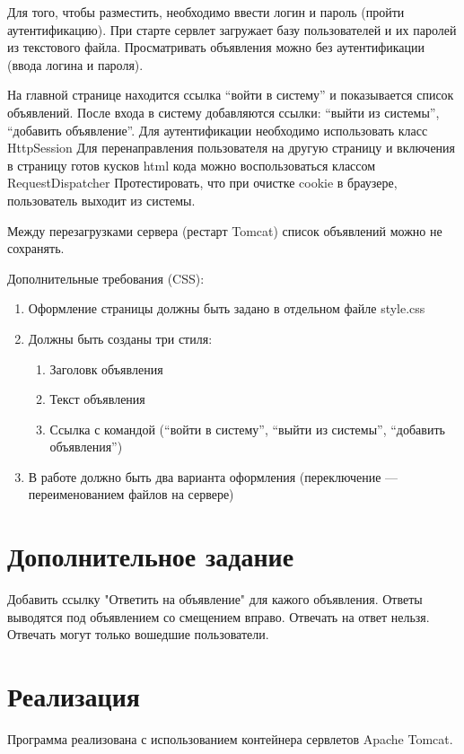 \documentclass{article}
\begin{document}
Для того, чтобы разместить, необходимо ввести логин и пароль (пройти аутентификацию). При старте сервлет загружает базу пользователей и их паролей из текстового файла. Просматривать объявления можно без аутентификации (ввода логина и пароля).

На главной странице находится ссылка “войти в систему” и показывается список объявлений. После входа в систему добавляются ссылки: “выйти из системы”, “добавить объявление”. 
Для аутентификации необходимо использовать класс HttpSession
Для перенаправления пользователя на другую страницу и включения в  страницу готов кусков html кода можно воспользоваться классом RequestDispatcher
Протестировать, что при очистке cookie в браузере, пользователь выходит из системы.

Между перезагрузками сервера (рестарт Tomcat) список объявлений можно не сохранять.

Дополнительные требования (CSS):


\begin{enumerate}
	\item Оформление страницы должны быть задано в отдельном файле style.css
	\item Должны быть созданы три стиля:

	\begin{enumerate}
	\item Заголовк объявления 
	\item Текст объявления
	\item Ссылка с командой  (“войти в систему”, “выйти из системы”, “добавить объявления”)
	\end{enumerate}
	\item В работе должно быть два варианта оформления (переключение --- переименованием файлов на сервере)
\end{enumerate}

\section{Дополнительное задание}
Добавить ссылку "Ответить на объявление" для кажого объявления. Ответы выводятся под объявлением со смещением вправо. Отвечать на ответ нельзя. Отвечать могут только вошедшие пользователи.

\section{Реализация}
Программа реализована с использованием контейнера сервлетов Apache Tomcat.
\end{document}
